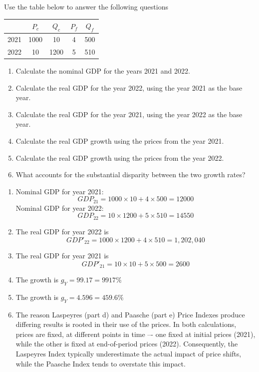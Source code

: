\documentclass[addpoints,ngerman,12pt,answers]{exam}
\begin{document}
	\vspace*{3em}
	
	
	\vspace*{3em}
	\begin{questions}
		
		
		\question Use the table below to answer the following questions
		\begin{table}[htbp]
			\centering
			\begin{tabular}{lcccc} \hline \hline
				& $P_c$  & $Q_c$  & $P_f$  & $Q_f$ \\ \hline
				2021  & 1000  & 10    & 4     & 500 \\
				2022  & 10    & 1200  & 5     & 510 \\ \hline
			\end{tabular}%
			\label{tab:addlabel}%
		\end{table}%
		\begin{enumerate}[label=(\alph*)]
			\item Calculate the nominal GDP for the years 2021 and 2022.
			\item Calculate the real GDP for the year 2022, using the year 2021 as the base year.
			\item Calculate the real GDP for the year 2021, using the year 2022 as the base year.
			\item Calculate the real GDP growth using the prices from the year 2021.
			\item Calculate the real GDP growth using the prices from the year 2022.
			\item What accounts for the substantial disparity between the two growth rates?
		\end{enumerate}
		\clearpage
		\begin{solution}
			\begin{enumerate}[label=(\alph*)]
				\item Nominal GDP for year 2021:
				\[GDP_{21} = 1000 \times 10 + 4 \times 500 = 12000\]
				Nominal GDP for year 2022:
				\[GDP_{22} = 10 \times 1200 + 5 \times 510 = 14550\]
				\item The real GDP for year 2022 is
				\[GDP'_{22} = 1000 \times 1200 + 4 \times 510 = 1,202,040\]
				\item The real GDP for year 2021 is
				\[GDP'_{21} = 10\times 10 + 5 \times 500 = 2600\]
				\item The growth is $g_Y = 99.17 = 9917\%$
				\item The growth is $g_Y = 4.596 = 459.6\%$
				\item 
				The reason Laspeyres (part d) and Paasche (part e) Price Indexes produce differing results is rooted in their use of the prices. In both calculations, prices are fixed, at different points in time –- one fixed at initial prices (2021), while the other is fixed at end-of-period prices (2022). Consequently, the Laspeyres Index typically underestimate the actual impact of price shifts, while the Paasche Index tends to overstate this impact.
				

\end{enumerate}
\end{solution}
\end{questions}
\end{document}
